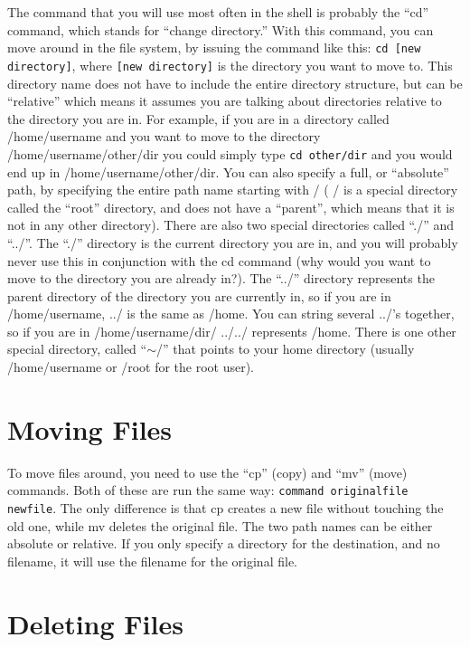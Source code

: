 \documentclass[12pt,letterpaper,oneside, openany]{book} \usepackage[latin1] {inputenc}
\begin{document}
The command that you will use most often in the shell is probably the ``cd'' command, which stands for ``change directory.''  With this command, you can move around in the file system, by issuing the command like this: \verb+cd [new directory]+, where \verb+[new directory]+ is the directory you want to move to.  This directory name does not have to include the entire directory structure, but can be ``relative'' which means it assumes you are talking about directories relative to the directory you are in.  For example, if you are in a directory called /home/username and you want to move to the directory /home/username/other/dir you could simply type \verb+cd other/dir+ and you would end up in /home/username/other/dir.  You can also specify a full, or ``absolute'' path, by specifying the entire path name starting with / ( / is a special directory called the ``root'' directory, and does not have a ``parent'', which means that it is not in any other directory).  There are also two special directories called ``./'' and ``../''.  The ``./'' directory is the current directory you are in, and you will probably never use this in conjunction with the cd command (why would you want to move to the directory you are already in?).  The ``../'' directory represents the parent directory of the directory you are currently in, so if you are in /home/username, ../ is the same as /home.  You can string several ../'s together, so if you are in /home/username/dir/ ../../ represents /home.  There is one other special directory, called ``$\sim$/'' that points to your home directory (usually /home/username or /root for the root user).

\section{Moving Files}

To move files around, you need to use the ``cp'' (copy) and ``mv'' (move) commands.  Both of these are run the same way: \verb+command originalfile newfile+.  The only difference is that cp creates a new file without touching the old one, while mv deletes the original file.  The two path names can be either absolute or relative.  If you only specify a directory for the destination, and no filename, it will use the filename for the original file.

\section{Deleting Files}
\end{document}
